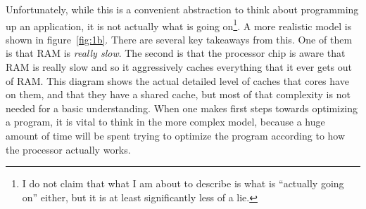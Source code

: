 Unfortunately, while this is a convenient abstraction to think about programming up an application, it
is not actually what is going on\footnote{I do not claim that what I am about to describe is what is ``actually going on'' either,
but it is at least significantly less of a lie.}. A more realistic model is shown in figure~\ref{fig:1b}. There are
several key takeaways from this. One of them is that RAM is \textit{really slow}. The second is that the processor
chip is aware that RAM is really slow and so it aggressively caches everything that it ever gets out of RAM. This diagram
shows the actual detailed level of caches that cores have on them, and that they have a shared cache, but most of that
complexity is not needed for a basic understanding. When one makes first steps towards optimizing a program, it is vital
to think in the more complex model, because a huge amount of time will be spent trying to optimize the program according
to how the processor actually works.

